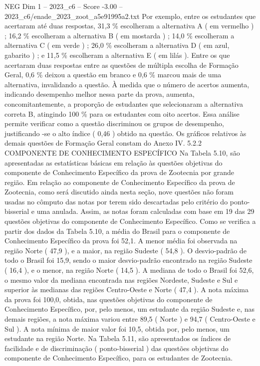 \begin{textsample}{NEG Dim 1 – 2023\_c6 – Score -3.00 – 2023\_c6/enade\_2023\_zoot\_a5e91995a2.txt}
Por exemplo, entre os estudantes que acertaram até duas respostas, 31,3 \% escolheram a alternativa A ( em vermelho ) ; 16,2 \% escolheram a alternativa B ( em mostarda ) ; 14,0 \% escolheram a alternativa C ( em verde ) ; 26,0 \% escolheram a alternativa D ( em azul, gabarito ) ; e 11,5 \% escolheram a alternativa E ( em lilás ).
Entre os que acertaram duas respostas entre as questões de múltipla escolha de Formação Geral, 0,6 \% deixou a questão em branco e 0,6 \% marcou mais de uma alternativa, invalidando a questão.
À medida que o número de acertos aumenta, indicando desempenho melhor nessa parte da prova, aumenta, concomitantemente, a proporção de estudantes que selecionaram a alternativa correta B, atingindo 100 \% para os estudantes com oito acertos.
Essa análise permite verificar como a questão discriminou os grupos de desempenho, justificando -se o alto índice ( 0,46 ) obtido na questão.
Os gráficos relativos às demais questões de Formação Geral constam do Anexo IV. 5.2.2 COMPONENTE DE CONHECIMENTO ESPECÍFICO Na Tabela 5.10, são apresentadas as estatísticas básicas em relação às questões objetivas do componente de Conhecimento Específico da prova de Zootecnia por grande região.
Em relação ao componente de Conhecimento Específico da prova de Zootecnia, como será discutido ainda nesta seção, nove questões não foram usadas no cômputo das notas por terem sido descartadas pelo critério do ponto-bisserial e uma anulada.
Assim, as notas foram calculadas com base em 19 das 29 questões objetivas do componente de Conhecimento Específico.
Como se verifica a partir dos dados da Tabela 5.10, a média do Brasil para o componente de Conhecimento Específico da prova foi 52,1.
A menor média foi observada na região Norte ( 47,9 ), e a maior, na região Sudeste ( 54,8 ).
O desvio-padrão de todo o Brasil foi 15,9, sendo o maior desvio-padrão encontrado na região Sudeste ( 16,4 ), e o menor, na região Norte ( 14,5 ).
A mediana de todo o Brasil foi 52,6, o mesmo valor da mediana encontrada nas regiões Nordeste, Sudeste e Sul e superior às medianas das regiões Centro-Oeste e Norte ( 47,4 ).
A nota máxima da prova foi 100,0, obtida, nas questões objetivas do componente de Conhecimento Específico, por, pelo menos, um estudante da região Sudeste e, nas demais regiões, a nota máxima variou entre 89,5 ( Norte ) e 94,7 ( Centro-Oeste e Sul ).
A nota mínima de maior valor foi 10,5, obtida por, pelo menos, um estudante na região Norte.
Na Tabela 5.11, são apresentados os índices de facilidade e de discriminação ( ponto-bisserial ) das questões objetivas do componente de Conhecimento Específico, para os estudantes de Zootecnia.

\end{textsample}
